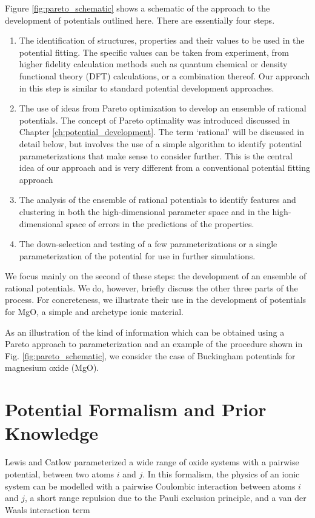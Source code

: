 Figure \ref{fig:pareto_schematic} shows a schematic of the approach to the development of potentials outlined here. There are essentially four steps.
\begin{enumerate}
	\item The identification of structures, properties and their values to be used in the potential fitting. The specific values can be taken from experiment, from higher fidelity calculation methods such as quantum chemical or density functional theory (DFT) calculations, or a combination thereof. Our approach in this step is similar to standard potential development approaches.
 \item The use of ideas from Pareto optimization to develop an ensemble of rational potentials.  The concept of Pareto optimality was introduced discussed in Chapter \ref{ch:potential_development}. The term ‘rational’ will be discussed in detail below, but involves the use of a simple algorithm to identify potential parameterizations that make sense to consider further. This is the central idea of our approach and is very different from a conventional potential fitting approach
 	\item The analysis of the ensemble of rational potentials to identify features and clustering in both the high-dimensional parameter space and in the high-dimensional space of errors in the predictions of the properties.
 	\item The down-selection and testing of a few parameterizations or a single parameterization of the potential for use in further simulations.
\end{enumerate}

We focus mainly on the second of these steps: the development of an ensemble of rational potentials. We do, however, briefly discuss the other three parts of the process. For concreteness, we illustrate their use in the development of potentials for MgO, a simple and archetype ionic material.

As an illustration of the kind of information which can be obtained using a Pareto approach to parameterization and an example of the procedure shown in Fig. \ref{fig:pareto_schematic}, we consider the case of Buckingham potentials for magnesium oxide (MgO).

\section{Potential Formalism and Prior Knowledge}

Lewis and Catlow\cite{lewis1985_buckingham} parameterized a wide range of oxide systems with a pairwise potential, between two atoms $i$ and $j$.  In this formalism, the physics of an ionic system can be modelled with a pairwise Coulombic interaction between atoms $i$ and $j$, a short range repulsion due to the Pauli exclusion principle, and a van der Waals interaction term\cite{buckingham1938}

